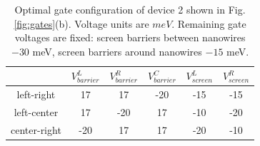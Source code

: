 \begin{table}[h!]
\centering
\begin{tabular}{||c ||c c c c c ||} 
 \hline
&  $V_{barrier}^L$ & $V_{barrier}^R$ & $V_{barrier}^C$ & $V_{screen}^L$ & $V_{screen}^R$ \\
 \hline\hline
 left-right & 17 & 17 & -20 & -15 & -15\\ 
 \hline
 left-center  & 17 & -20 & 17 & -10 & -20\\ 
 \hline
 center-right & -20 & 17 & 17 & -20 & -10\\ 
 \hline
 \hline
\end{tabular}
\caption{Optimal gate configuration of device 2 shown in Fig. \ref{fig:gates}(b). Voltage units are $meV$. Remaining gate voltages are fixed: screen barriers between nanowires $-30$ meV, screen barriers around nanowires $-15$ meV.}
\label{table:gate_voltages_2}
\end{table}



